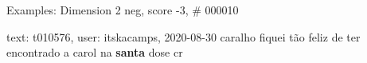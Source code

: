 \begin{frame}{Examples: Dimension 2 neg, score -3, \# 000010}
\footnotesize
\begin{alertblock}{text: t010576, user: itskacamps, 2020-08-30}
caralho fiquei tão feliz de ter encontrado a carol na \textbf{santa} dose cr 
\end{alertblock}
\end{frame}

